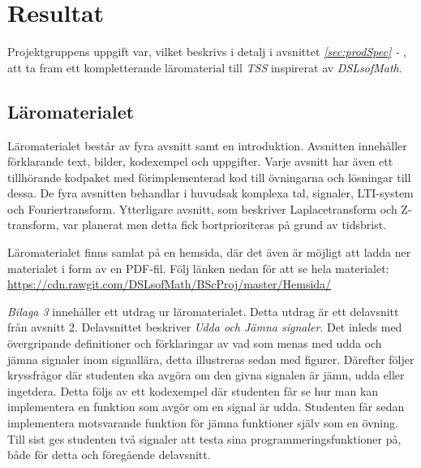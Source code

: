 \documentclass[12pt,a4paper,twoside,openright]{article}
\begin{document}
\section{Resultat}


%
Projektgruppens uppgift var, vilket beskrivs i detalj i avsnittet
\textit{\ref{sec:prodSpec} - }, att ta fram ett kompletterande
läromaterial till \textit{TSS} inspirerat av \textit{DSLsofMath}.


\subsection{Läromaterialet}

Läromaterialet består av fyra avsnitt samt en introduktion. Avsnitten
innehåller förklarande text, bilder, kodexempel och uppgifter. Varje
avsnitt har även ett tillhörande kodpaket med förimplementerad kod
till övningarna och lösningar till dessa. De fyra avsnitten behandlar
i huvudsak komplexa tal, signaler, LTI-system och Fouriertransform.
Ytterligare avsnitt, som beskriver Laplacetransform och
Z-transform, var planerat men detta fick bortprioriteras på grund av
tidsbrist.

Läromaterialet finns samlat på en hemsida, där det även är möjligt att
ladda ner materialet i form av en PDF-fil. Följ länken nedan för att
se hela materialet:
\url{https://cdn.rawgit.com/DSLsofMath/BScProj/master/Hemsida/}


\textit{Bilaga 3} innehåller ett utdrag ur läromaterialet. Detta
utdrag är ett delavsnitt från avsnitt 2. Delavsnittet beskriver
\textit{Udda och Jämna signaler}. Det inleds med övergripande
definitioner och förklaringar av vad som menas med udda och jämna
signaler inom signallära, detta illustreras sedan med
figurer. Därefter följer kryssfrågor där studenten ska avgöra om den
givna signalen är jämn, udda eller ingetdera. Detta följs av ett
kodexempel där studenten får se hur man kan implementera en funktion
som avgör om en signal är udda. Studenten får sedan implementera
motsvarande funktion för jämna funktioner själv som en övning. Till
sist ges studenten två signaler att testa sina
programmeringsfunktioner på, både för detta och föregående delavsnitt.
\end{document}
